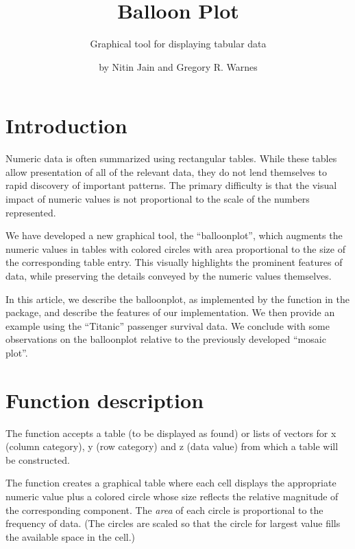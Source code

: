 \documentclass[a4paper]{report}
\begin{document}
\begin{article}
\author{by Nitin Jain and Gregory R. Warnes}
\title{Balloon Plot}
\subtitle{Graphical tool for displaying tabular data}

\maketitle

\section*{Introduction}

Numeric data is often summarized using rectangular tables. While
these tables allow presentation of all of the relevant data, they do
not lend themselves to rapid discovery of important patterns. The
primary difficulty is that the visual impact of numeric values is
not proportional to the scale of the numbers represented.

We have developed a new graphical tool, the ``balloonplot'',
which augments the numeric values in tables with colored circles
with area proportional to the size of the corresponding table
entry. This visually highlights the prominent features of
data, while preserving the details conveyed by the numeric values
themselves.

In this article, we describe the balloonplot, as implemented by the
 function in the  package, and
describe the features of our implementation.  We then provide an
example using the ``Titanic'' passenger survival data.  We conclude
with some observations on the balloonplot relative to the
previously developed ``mosaic plot''.

\section*{Function description}

The  function accepts a table (to be displayed as
found) or lists of vectors for x (column category), y (row category)
and z (data value) from which a table will be constructed.

The  function creates a graphical table
where each cell displays the appropriate numeric value plus a
colored circle whose size reflects the relative magnitude of the
corresponding component. The
\emph{area} of each circle is proportional to the frequency of
data. (The circles are scaled so that the circle for largest value
fills the available space in the cell.)



\end{article}
\end{document}

